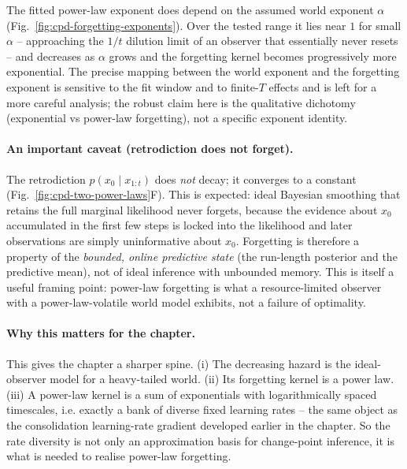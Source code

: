 The fitted power-law exponent does depend on the assumed world exponent
$\alpha$ (Fig.~\ref{fig:cpd-forgetting-exponents}). Over the tested range
it lies near $1$ for small $\alpha$ -- approaching the $1/t$ dilution
limit of an observer that essentially never resets -- and decreases as
$\alpha$ grows and the forgetting kernel becomes progressively more
exponential. The precise mapping between the world exponent and the
forgetting exponent is sensitive to the fit window and to finite-$T$
effects and is left for a more careful analysis; the robust claim here
is the qualitative dichotomy (exponential vs power-law forgetting), not a
specific exponent identity.

\paragraph{An important caveat (retrodiction does not forget).}
The retrodiction $p(x_0 \mid x_{1:t})$ does \emph{not} decay; it
converges to a constant (Fig.~\ref{fig:cpd-two-power-laws}F). This is
expected: ideal Bayesian smoothing that retains the full marginal
likelihood never forgets, because the evidence about $x_0$ accumulated
in the first few steps is locked into the likelihood and later
observations are simply uninformative about $x_0$. Forgetting is
therefore a property of the \emph{bounded, online predictive state}
(the run-length posterior and the predictive mean), not of ideal
inference with unbounded memory. This is itself a useful framing point:
power-law forgetting is what a resource-limited observer with a
power-law-volatile world model exhibits, not a failure of optimality.

\paragraph{Why this matters for the chapter.}
This gives the chapter a sharper spine. (i) The decreasing hazard is the
ideal-observer model for a heavy-tailed world. (ii) Its forgetting
kernel is a power law. (iii) A power-law kernel is a sum of exponentials
with logarithmically spaced timescales, i.e. exactly a bank of diverse
fixed learning rates -- the same object as the consolidation
learning-rate gradient developed earlier in the chapter. So the rate
diversity is not only an approximation basis for change-point inference,
it is what is needed to realise power-law forgetting.


